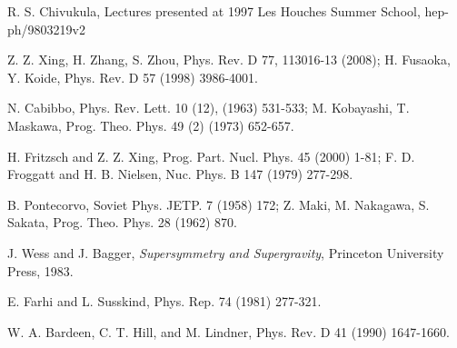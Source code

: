 \documentclass[12pt]{article}
\renewcommand\[{\begin{dmath}}
\renewcommand\]{\end{dmath}}
\begin{document}
\begin{thebibliography}{99}
  R. S. Chivukula, Lectures presented at 1997 Les Houches Summer School, hep-ph/9803219v2




  Z. Z. Xing, H. Zhang, S. Zhou, Phys. Rev.  D    77, 113016-13
  (2008); H. Fusaoka, Y. Koide, Phys. Rev. D   57  (1998)  3986-4001.



   N. Cabibbo,
 Phys. Rev. Lett.  10 (12), (1963) 531-533;
  M. Kobayashi, T. Maskawa,
     Prog.   Theo. Phys. 49 (2) (1973) 652-657.

 H. Fritzsch and Z. Z.  Xing,
 Prog. Part. Nucl. Phys. 45  (2000)  1-81;
    F. D. Froggatt and H. B. Nielsen,
Nuc. Phys. B 147 (1979) 277-298.



 B. Pontecorvo,
Soviet Phys. JETP. 7 (1958) 172;  Z. Maki,   M. Nakagawa,   S. Sakata,
 Prog.  Theo. Phys.  28   (1962) 870.

 J. Wess and J. Bagger,  {\it Supersymmetry and Supergravity}, Princeton University Press, 1983.

 E. Farhi and L. Susskind, Phys. Rep.   74 (1981) 277-321.


 W. A. Bardeen, C. T. Hill, and M. Lindner,
 Phys. Rev. D    41  (1990)   1647-1660.


\end{thebibliography}
\end{document}
